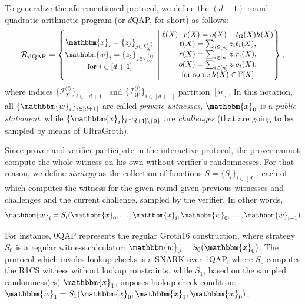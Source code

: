 \documentclass[../../book]{subfiles}
\begin{document}
To generalize the aforementioned protocol, we define the $(d+1)$-round quadratic arithmetic program (or $d$QAP, for short) as follows:
\[
\small\mathcal{R}_{\text{dQAP}} = \left\{ 
    \begin{matrix} 
        \mathbbm{x}_i = \{z_j\}_{j \in \mathcal{I}_{X}^{\langle i \rangle}} \\
        \mathbbm{w}_i = \{z_j\}_{j \in \mathcal{I}_{W}^{\langle i \rangle}} \\
        \text{for }i \in [d+1]
    \end{matrix}
    \; \middle| \; 
    \begin{matrix}
        \ell(X) \cdot r(X) = o(X) + t_{\Omega}(X)h(X) \\
        \ell(X) = \sum_{i \in [n]}z_i\ell_i(X), \\
        r(X) = \sum_{i \in [n]}z_ir_i(X), \\
        o(X) = \sum_{i \in [n]}z_io_i(X), \\
        \text{for some} \; h(X) \in \mathbb{F}[X]
    \end{matrix}
\right\},
\]
where indices $\{\mathcal{I}_X^{\langle i \rangle}\}_{i \in [d+1]}$ and $\{\mathcal{I}_W^{\langle i \rangle}\}_{i \in [d+1]}$ partition $[n]$. In this notation, all $\{\mathbbm{w}_i\}_{i \in [d+1]}$ are called \textit{private witnesses}, $\mathbbm{x}_0$ is a \textit{public statement}, while $\{\mathbbm{x}_i\}_{i \in [d+1]\setminus \{0\}}$ are \textit{challenges} (that are going to be sampled by means of UltraGroth).

Since prover and verifier participate in the interactive protocol, the prover cannot compute the whole witness on his own without verifier's randomnesses. For that reason, we define \textit{strategy} as the collection of functions $S=\{S_i\}_{i \in [d]}$, each of which computes the witness for the given round given previous witnesses and challenges and the current challenge, sampled by the verifier. In other words,
\[
\mathbbm{w}_i = S_i(\mathbbm{x}_0,\dots,\mathbbm{x}_i,\mathbbm{w}_0,\dots,\mathbbm{w}_{i-1})
\]

\begin{example}
For instance, 0QAP represents the regular Groth16 construction, where strategy
$S_0$ is a regular witness calculator: $\mathbbm{w}_0=S_0(\mathbbm{x}_0)$. The
protocol which involes lookup checks is a SNARK over 1QAP, where $S_0$ computes
the R1CS witness without lookup constraints, while $S_1$, based on the sampled
randomness(es) $\mathbbm{x}_1$, imposes lookup check condition:
$\mathbbm{w}_1=S_1(\mathbbm{x}_0,\mathbbm{x}_1,\mathbbm{w}_0)$.
\end{example}
\end{document}
